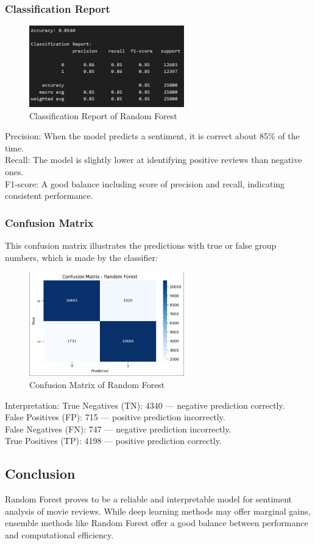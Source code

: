 \subsubsection{Classification Report}
\begin{figure}[ht]
    \centering
    \includegraphics[width=0.6\textwidth]{pics/rf_accuracy_2.png}
    \caption{Classification Report of Random Forest}
\end{figure}

Precision: When the model predicts a sentiment, it is correct about 85\% of the time. \\
Recall: The model is slightly lower at identifying positive reviews than negative ones. \\
F1-score: A good balance including score of precision and recall, indicating consistent performance.

\subsubsection{Confusion Matrix}
This confusion matrix illustrates the predictions with true or false group numbers, which is made by the classifier:

\begin{figure}[ht]
    \centering
    \includegraphics[width=0.6\textwidth]{pics/rf_matrix_2.png}
    \caption{Confusion Matrix of Random Forest}
\end{figure}

Interpretation:
True Negatives (TN): 4340 — negative prediction correctly. \\
False Positives (FP): 715 — positive prediction incorrectly. \\
False Negatives (FN): 747 — negative prediction incorrectly. \\
True Positives (TP): 4198 — positive prediction correctly.

\subsection{Conclusion}
Random Forest proves to be a reliable and interpretable model for sentiment analysis of movie reviews. While deep learning methods may offer marginal gains, ensemble methods like Random Forest offer a good balance between performance and computational efficiency.


